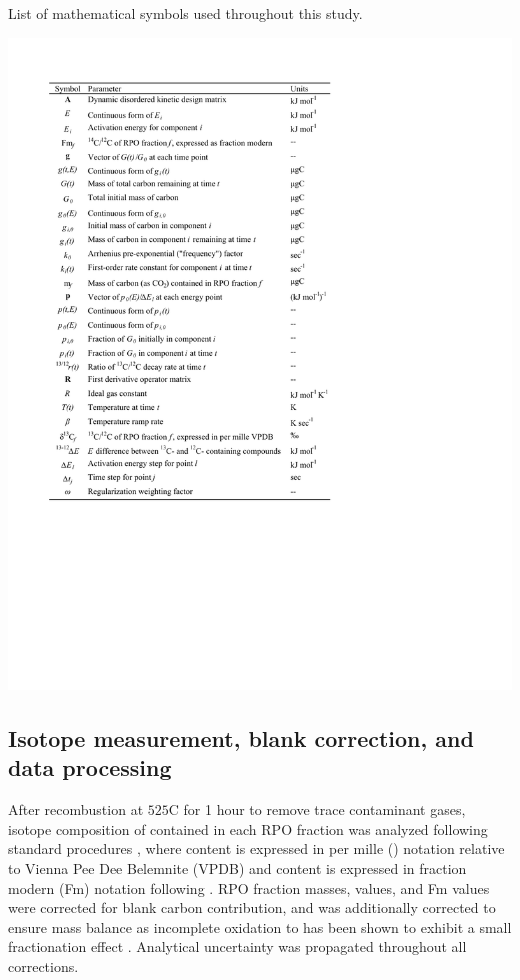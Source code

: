 \begin{table}[p]
	\caption[List of mathematical symbols used throughout this study]{List of mathematical symbols used throughout this study.}
	\centering
		\includegraphics{Thesis_Tables/Ch3Tab1}
	\label{Ch3Tab:1} 
\end{table}

\subsection{Isotope measurement, blank correction, and data processing}

After recombustion at $525$\textdegree C for 1 hour to remove trace contaminant gases, isotope composition of  contained in each RPO fraction was analyzed following standard procedures \citep{McNichol:1994ty,Pearson:1998vy}, where  content is expressed in  per mille (\textperthousand) notation relative to Vienna Pee Dee Belemnite (VPDB) and  content is expressed in fraction modern (Fm) notation following \citet{Stuiver:1977uh}. RPO fraction masses,  values, and Fm values were corrected for blank carbon contribution, and  was additionally corrected to ensure  mass balance as incomplete oxidation to  has been shown to exhibit a small fractionation effect \citep{Hemingway:2016rc}. Analytical uncertainty was propagated throughout all corrections.

